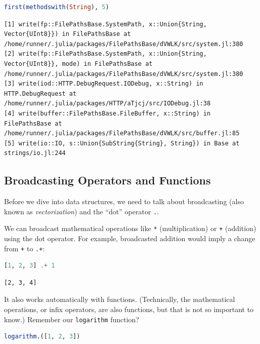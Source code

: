 \documentclass[
  notoc %
]{tufte-book}
\newcommand{\passthrough}[1]{#1}
\begin{document}
\begin{lstlisting}[language=Julia]
first(methodswith(String), 5)
\end{lstlisting}

\begin{lstlisting}[language=Output]
[1] write(fp::FilePathsBase.SystemPath, x::Union{String, Vector{UInt8}}) in FilePathsBase at /home/runner/.julia/packages/FilePathsBase/dVWLK/src/system.jl:380
[2] write(fp::FilePathsBase.SystemPath, x::Union{String, Vector{UInt8}}, mode) in FilePathsBase at /home/runner/.julia/packages/FilePathsBase/dVWLK/src/system.jl:380
[3] write(iod::HTTP.DebugRequest.IODebug, x::String) in HTTP.DebugRequest at /home/runner/.julia/packages/HTTP/aTjcj/src/IODebug.jl:38
[4] write(buffer::FilePathsBase.FileBuffer, x::String) in FilePathsBase at /home/runner/.julia/packages/FilePathsBase/dVWLK/src/buffer.jl:85
[5] write(io::IO, s::Union{SubString{String}, String}) in Base at strings/io.jl:244
\end{lstlisting}

\hypertarget{sec:broadcasting}{%
\subsection{Broadcasting Operators and
Functions}\label{sec:broadcasting}}

Before we dive into data structures, we need to talk about broadcasting
(also known as \emph{vectorization}) and the ``dot'' operator
\passthrough{\lstinline!.!}.

We can broadcast mathematical operations like
\passthrough{\lstinline!*!} (multiplication) or
\passthrough{\lstinline!+!} (addition) using the dot operator. For
example, broadcasted addition would imply a change from
\passthrough{\lstinline!+!} to \passthrough{\lstinline!.+!}:

\begin{lstlisting}[language=Julia]
[1, 2, 3] .+ 1
\end{lstlisting}

\begin{lstlisting}[language=Output]
[2, 3, 4]
\end{lstlisting}

It also works automatically with functions. (Technically, the
mathematical operations, or infix operators, are also functions, but
that is not so important to know.) Remember our
\passthrough{\lstinline!logarithm!} function?

\begin{lstlisting}[language=Julia]
logarithm.([1, 2, 3])
\end{lstlisting}
\end{document}
